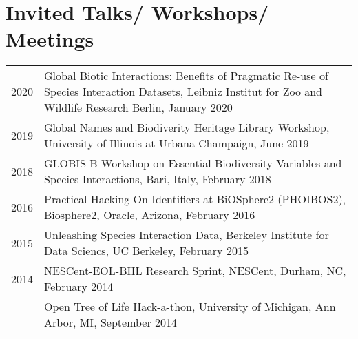 \documentclass[11pt,fullpage]{article}
\begin{document}



\section*{Invited Talks/ Workshops/ Meetings}

\begin{longtable}{p{0.5in}|p{5.5in}}

 
 2020 & Global Biotic Interactions: Benefits of Pragmatic Re-use of Species Interaction Datasets, Leibniz Institut for Zoo and Wildlife Research Berlin, January 2020 \\

 2019 & Global Names and Biodiverity Heritage Library Workshop, University of Illinois at Urbana-Champaign, June 2019 \\

 2018 
 & GLOBIS-B Workshop on Essential Biodiversity Variables and Species Interactions, Bari, Italy, February 2018 \\ 

 2016 &  Practical Hacking On Identifiers at BiOSphere2 (PHOIBOS2), Biosphere2, Oracle, Arizona, February 2016 \\
 
 2015 &  Unleashing Species Interaction Data, Berkeley Institute for Data Sciencs, UC Berkeley, February 2015 \\

 2014 & NESCent-EOL-BHL Research Sprint, NESCent, Durham, NC, February 2014 \\ 
  & Open Tree of Life Hack-a-thon, University of Michigan, Ann Arbor, MI, September 2014 \\ 

\end{longtable}



\end{document}
